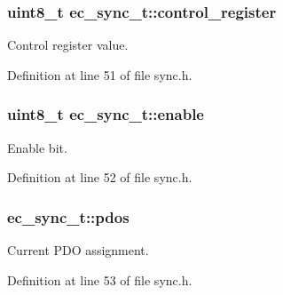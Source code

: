 \subsubsection[{control\-\_\-register}]{\setlength{\rightskip}{0pt plus 5cm}uint8\-\_\-t {\bf ec\-\_\-sync\-\_\-t\-::control\-\_\-register}}\label{structec__sync__t_aede99eccf8db60056e6deebe66501365}


\-Control register value. 



\-Definition at line 51 of file sync.\-h.

\subsubsection[{enable}]{\setlength{\rightskip}{0pt plus 5cm}uint8\-\_\-t {\bf ec\-\_\-sync\-\_\-t\-::enable}}\label{structec__sync__t_a581dfbd7e289ab43dc3f5b7f844c4776}


\-Enable bit. 



\-Definition at line 52 of file sync.\-h.

\subsubsection[{pdos}]{ {\bf ec\-\_\-sync\-\_\-t\-::pdos}}\label{structec__sync__t_a96e5121c2fd258439b25d1a826ec5970}


\-Current \-P\-D\-O assignment. 



\-Definition at line 53 of file sync.\-h.

